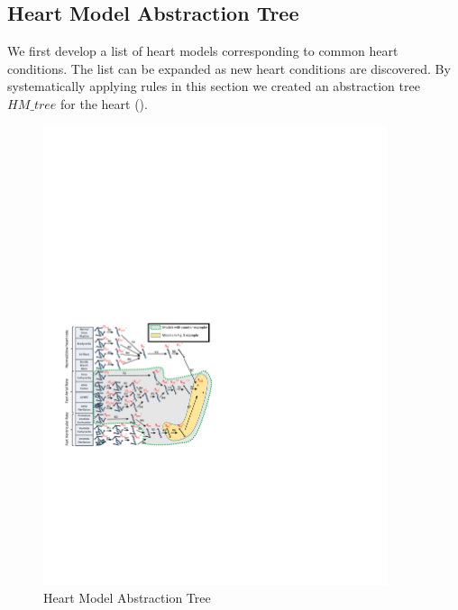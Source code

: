 

\subsection{Heart Model Abstraction Tree}
We first develop a list of heart models corresponding to common heart conditions. The list can be expanded as new heart conditions are discovered.
By systematically applying rules in this section we created an abstraction tree $HM\_tree$ for the heart (). 
\begin{figure}[!t]
	\centering
	\includegraphics[width=0.9\textwidth]{figs/abs.pdf}
	\caption{\small Heart Model Abstraction Tree}
	\label{fig:HM_abs}
\end{figure}


